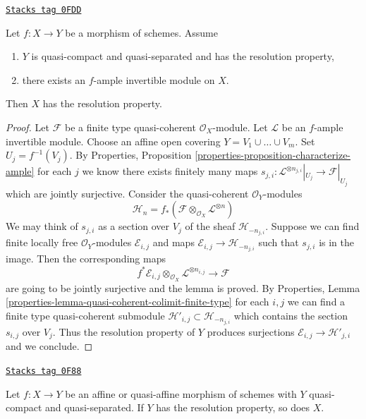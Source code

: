 \begin{lemma}
\label{perfect-lemma-resolution-property-ample-relative}
\href{https://stacks.math.columbia.edu/tag/0FDD}{\texttt{Stacks tag 0FDD}}

Let $f : X \to Y$ be a morphism of schemes. Assume
\begin{enumerate}
\item $Y$ is quasi-compact and quasi-separated and has the resolution property,
\item there exists an $f$-ample invertible module on $X$.
\end{enumerate}
Then $X$ has the resolution property.
\end{lemma}

\begin{proof}
Let $\mathcal{F}$ be a finite type quasi-coherent $\mathcal{O}_X$-module.
Let $\mathcal{L}$ be an $f$-ample invertible module.
Choose an affine open covering $Y = V_1 \cup \ldots \cup V_m$.
Set $U_j = f^{-1}(V_j)$. By Properties, Proposition
\ref{properties-proposition-characterize-ample}
for each $j$ we know there exists finitely many maps
$s_{j, i} : \mathcal{L}^{\otimes n_{j, i}}|_{U_j} \to \mathcal{F}|_{U_j}$
which are jointly surjective. Consider the quasi-coherent
$\mathcal{O}_Y$-modules
$$
\mathcal{H}_n =
f_*(\mathcal{F} \otimes_{\mathcal{O}_X} \mathcal{L}^{\otimes n})
$$
We may think of $s_{j, i}$ as a section over $V_j$ of the sheaf
$\mathcal{H}_{-n_{j, i}}$. Suppose we can find finite locally
free $\mathcal{O}_Y$-modules $\mathcal{E}_{i, j}$ and maps
$\mathcal{E}_{i, j} \to \mathcal{H}_{-n_{j, i}}$ such that
$s_{j, i}$ is in the image. Then the corresponding maps
$$
f^*\mathcal{E}_{i, j}
\otimes_{\mathcal{O}_X}
\mathcal{L}^{\otimes n_{i, j}} \longrightarrow \mathcal{F}
$$
are going to be jointly surjective and the lemma is proved. By
Properties, Lemma \ref{properties-lemma-quasi-coherent-colimit-finite-type}
for each $i, j$ we can find a finite
type quasi-coherent submodule
$\mathcal{H}'_{i, j} \subset  \mathcal{H}_{-n_{j, i}}$
which contains the section $s_{i, j}$ over $V_j$.
Thus the resolution property of $Y$ produces surjections
$\mathcal{E}_{i, j} \to \mathcal{H}'_{j, i}$ and we conclude.
\end{proof}

\begin{lemma}
\label{perfect-lemma-resolution-property-goes-up-affine}
\href{https://stacks.math.columbia.edu/tag/0F88}{\texttt{Stacks tag 0F88}}

Let $f : X \to Y$ be an affine or quasi-affine morphism of schemes with
$Y$ quasi-compact and quasi-separated.
If $Y$ has the resolution property, so does $X$.
\end{lemma}

